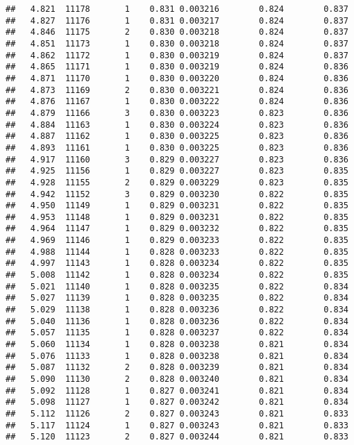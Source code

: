 \documentclass[
]{book}
\begin{document}
\begin{verbatim}
##   4.821  11178       1    0.831 0.003216        0.824        0.837
##   4.827  11176       1    0.831 0.003217        0.824        0.837
##   4.846  11175       2    0.830 0.003218        0.824        0.837
##   4.851  11173       1    0.830 0.003218        0.824        0.837
##   4.862  11172       1    0.830 0.003219        0.824        0.837
##   4.865  11171       1    0.830 0.003219        0.824        0.836
##   4.871  11170       1    0.830 0.003220        0.824        0.836
##   4.873  11169       2    0.830 0.003221        0.824        0.836
##   4.876  11167       1    0.830 0.003222        0.824        0.836
##   4.879  11166       3    0.830 0.003223        0.823        0.836
##   4.884  11163       1    0.830 0.003224        0.823        0.836
##   4.887  11162       1    0.830 0.003225        0.823        0.836
##   4.893  11161       1    0.830 0.003225        0.823        0.836
##   4.917  11160       3    0.829 0.003227        0.823        0.836
##   4.925  11156       1    0.829 0.003227        0.823        0.835
##   4.928  11155       2    0.829 0.003229        0.823        0.835
##   4.942  11152       3    0.829 0.003230        0.822        0.835
##   4.950  11149       1    0.829 0.003231        0.822        0.835
##   4.953  11148       1    0.829 0.003231        0.822        0.835
##   4.964  11147       1    0.829 0.003232        0.822        0.835
##   4.969  11146       1    0.829 0.003233        0.822        0.835
##   4.988  11144       1    0.828 0.003233        0.822        0.835
##   4.997  11143       1    0.828 0.003234        0.822        0.835
##   5.008  11142       1    0.828 0.003234        0.822        0.835
##   5.021  11140       1    0.828 0.003235        0.822        0.834
##   5.027  11139       1    0.828 0.003235        0.822        0.834
##   5.029  11138       1    0.828 0.003236        0.822        0.834
##   5.040  11136       1    0.828 0.003236        0.822        0.834
##   5.057  11135       1    0.828 0.003237        0.822        0.834
##   5.060  11134       1    0.828 0.003238        0.821        0.834
##   5.076  11133       1    0.828 0.003238        0.821        0.834
##   5.087  11132       2    0.828 0.003239        0.821        0.834
##   5.090  11130       2    0.828 0.003240        0.821        0.834
##   5.092  11128       1    0.827 0.003241        0.821        0.834
##   5.098  11127       1    0.827 0.003242        0.821        0.834
##   5.112  11126       2    0.827 0.003243        0.821        0.833
##   5.117  11124       1    0.827 0.003243        0.821        0.833
##   5.120  11123       2    0.827 0.003244        0.821        0.833

\end{verbatim}
\end{document}

